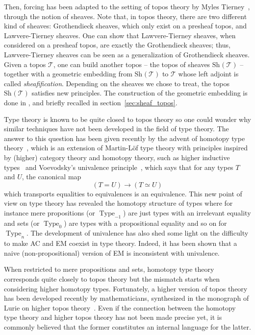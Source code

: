 \documentclass[notfinal]{jfrarticle}
\DeclareMathOperator{\Type}{Type}
\newcommand \Sh[1] {\mathrm{Sh}_{#1}}
\begin{document}
Then, forcing has been adapted to the setting of topos theory by Myles
Tierney~\cite{tierney1972}, through the notion of sheaves.  Note that,
in topos theory, there are two different kind of sheaves: Grothendieck
sheaves, which only exist on a presheaf topos, and Lawvere-Tierney
sheaves. One can show that Lawvere-Tierney sheaves, when considered on
a presheaf topos, are exactly the Grothendieck sheaves; thus,
Lawvere-Tierney sheaves can be seen as a generalization of
Grothendieck sheaves.  Given a topos $\mathcal T$, one can build
another topos -- the topos of sheaves $\Sh{}(\mathcal T)$ -- together
with a geometric embedding from $\Sh{}(\mathcal T)$ to $\mathcal T$
whose left adjoint is
called {\em sheafification}.  Depending on the sheaves we chose to treat,
the topos $\Sh{}(\mathcal T)$ satisfies new principles. The
construction of the geometric embedding is done in \cite[Section
V.3]{maclanemoerdijk}, and briefly recalled in
section~\ref{sec:sheaf_topos}.

Type theory is known to be quite closed to topos theory so one could
wonder why similar techniques have not been developed in the field of
type theory.
%
The answer to this question has been given recently by the advent of
homotopy type theory~\cite{hottbook}, which is an extension of
Martin-Löf type theory with principles inspired by (higher) category
theory and homotopy theory, such as higher inductive
types~\cite{lumsdaine2011higher,lumsdaine2013higher} and
Voevodsky's univalence principle~\cite{kapulkin2012simplicial}, which
says that for any types $T$ and $U$, the canonical map 
$$
(T = U) \to (T \simeq U)
$$ 
%
which transports equalities to equivalences is an equivalence.
%
This new point of view on type theory has revealed the homotopy
structure of types where for instance mere propositions (or
$\Type_{-1}$) are just types with an
irrelevant equality and sets (or $\Type_{0}$) are types
with a propositional equality and so on for $\Type_{n}$.
%
The development of univalence has also shed some light on the
difficulty to make AC and EM coexist in type theory. Indeed, it
has been shown that a naive (non-propositional) version of EM is
inconsistent with univalence.

When restricted to mere propositions and sets, homotopy type
theory corresponds quite closely to topos theory but the mismatch
starts when considering higher homotopy types.
%
Fortunately, a higher version of topos theory has been developed
recently by mathematicians, synthesized in the monograph of Lurie on
higher topos theory~\cite{lurie}. Even if the connection between the
homotopy type theory and higher topos theory has not been made precise
yet, it is commonly believed that the former constitutes an internal
language for the latter. 
\end{document}
